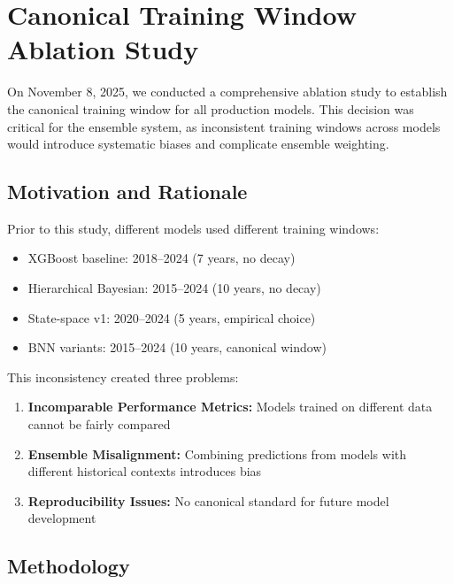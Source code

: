 
\section{Canonical Training Window Ablation Study}
\label{sec:training_window_ablation}

On November 8, 2025, we conducted a comprehensive ablation study to establish the canonical training window for all production models. This decision was critical for the ensemble system, as inconsistent training windows across models would introduce systematic biases and complicate ensemble weighting.

\subsection{Motivation and Rationale}

Prior to this study, different models used different training windows:
\begin{itemize}
    \item XGBoost baseline: 2018--2024 (7 years, no decay)
    \item Hierarchical Bayesian: 2015--2024 (10 years, no decay)
    \item State-space v1: 2020--2024 (5 years, empirical choice)
    \item BNN variants: 2015--2024 (10 years, canonical window)
\end{itemize}

This inconsistency created three problems:
\begin{enumerate}
    \item \textbf{Incomparable Performance Metrics:} Models trained on different data cannot be fairly compared
    \item \textbf{Ensemble Misalignment:} Combining predictions from models with different historical contexts introduces bias
    \item \textbf{Reproducibility Issues:} No canonical standard for future model development
\end{enumerate}

\subsection{Methodology}

